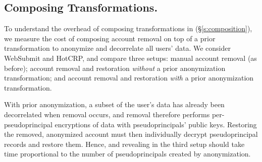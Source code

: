%
%
%

\subsection{Composing \Xxing Transformations.}
\label{s:eval-composition}

%
To understand the overhead of composing transformations in \sys (\S\ref{s:composition}), we measure the
cost of composing account removal on top of
a prior \xxing transformation to anonymize and decorrelate all users' data.
%
We consider WebSubmit and HotCRP, and compare three setups: \one{} manual
account removal (as before); \two{} account removal and restoration
\emph{without} a prior anonymization \xxing transformation; and \three{} account
removal and restoration \emph{with} a prior anonymization \xxing transformation.
%

%
With prior anonymization, a subset of the user's data has already been
decorrelated when removal occurs, and removal therefore performs
per-pseudoprincipal encryptions of \xxed data with pseudoprincipals' public
keys. 
%
%
Restoring the removed, anonymized account must then individually decrypt
pseudoprincipal records and restore them.
%
Hence, \xxing and revealing in the third setup should take time proportional to
the number of pseudoprincipals created by anonymization.
%

